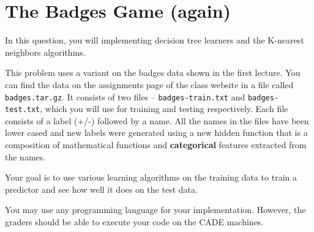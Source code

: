 \section{The Badges Game (again)}

In this question, you will implementing decision tree learners and the
K-nearest neighbors algorithms. 

This problem uses a variant on the badges data shown in the first
lecture. You can find the data on the assignments page of the class
website in a file called {\tt badges.tar.gz}. It consists of two files
-- {\tt badges-train.txt} and {\tt badges-test.txt}, which you will
use for training and testing respectively. Each file consists of a
label (+/-) followed by a name. 
%
All the names in the files have been lower cased and new labels were
generated using a new hidden function that is a composition of
mathematical functions and {\bf categorical} features extracted from
the names.

Your goal is to use various learning algorithms on the training data
to train a predictor and see how well it does on the test data.

You may use any programming language for your implementation. However,
the graders should be able to execute your code on the CADE machines.

